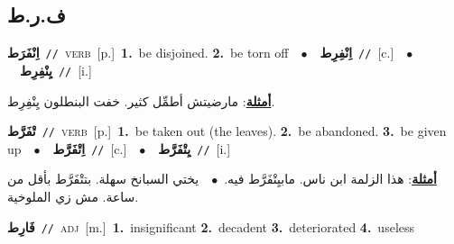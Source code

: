 \documentclass[10pt,a4paper,twoside]{article} %
\begin{document}
\begin{multicols}{2}
\vspace{-3mm}
\subsection*{\color{blue}\foreignlanguage{arabic}{ف.ر.ط}\color{blue}{}} 

{\setlength\topsep{0pt}\textbf{\foreignlanguage{arabic}{اِنْفَرَط}}\ {\color{gray}\texttt{//}\color{black}}\ \textsc{verb}\ [p.]\ \textbf{1.}~be disjoined.  \textbf{2.}~be torn off\ \ $\bullet$\ \ \setlength\topsep{0pt}\textbf{\foreignlanguage{arabic}{اِنْفِرِط}}\ {\color{gray}\texttt{//}\color{black}}\ [c.]\ \ $\bullet$\ \ \setlength\topsep{0pt}\textbf{\foreignlanguage{arabic}{يِنْفِرِط}}\ {\color{gray}\texttt{//}\color{black}}\ [i.]\  \begin{flushright}\color{gray}\foreignlanguage{arabic}{\textbf{\underline{\foreignlanguage{arabic}{أمثلة}}}: مارضيتش أطمِّل كثير. خفت البنطلون يِنْفِرِط.}\end{flushright}\color{black}} \vspace{2mm}

{\setlength\topsep{0pt}\textbf{\foreignlanguage{arabic}{تْفَرَّط}}\ {\color{gray}\texttt{//}\color{black}}\ \textsc{verb}\ [p.]\ \textbf{1.}~be taken out (the leaves).  \textbf{2.}~be abandoned.  \textbf{3.}~be given up\ \ $\bullet$\ \ \setlength\topsep{0pt}\textbf{\foreignlanguage{arabic}{اِتْفَرَّط}}\ {\color{gray}\texttt{//}\color{black}}\ [c.]\ \ $\bullet$\ \ \setlength\topsep{0pt}\textbf{\foreignlanguage{arabic}{يِتْفَرَّط}}\ {\color{gray}\texttt{//}\color{black}}\ [i.]\  \begin{flushright}\color{gray}\foreignlanguage{arabic}{\textbf{\underline{\foreignlanguage{arabic}{أمثلة}}}: هذا الزلمة ابن ناس. مابيِتْفَرَّط فيه.\ $\bullet$\ \  يختي السبانخ سهلة. بتتْفَرَّط بأقل من ساعة. مش زي الملوخية.}\end{flushright}\color{black}} \vspace{2mm}

{\setlength\topsep{0pt}\textbf{\foreignlanguage{arabic}{فَارِط}}\ {\color{gray}\texttt{//}\color{black}}\ \textsc{adj}\ [m.]\ \textbf{1.}~insignificant  \textbf{2.}~decadent  \textbf{3.}~deteriorated  \textbf{4.}~useless\ } \vspace{2mm}


\end{multicols}
\end{document}
